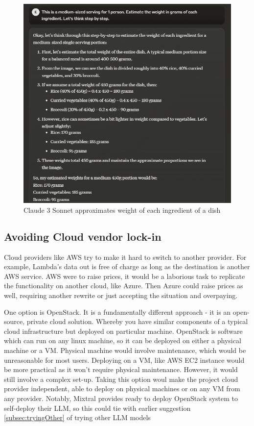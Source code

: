 \begin{figure}
    
    \centering
    \includegraphics[width=1\textwidth,keepaspectratio]{../images/sonnet_vision_2.png}
    \caption{Claude 3 Sonnet approximates weight of each ingredient of a dish}
    \label{fig:sonnetV2}
    
\end{figure}

\subsection{Avoiding Cloud vendor lock-in}
Cloud providers like AWS try to make it hard to switch to another provider. For example, Lambda's data out is free of charge as long as the destination is another AWS service. AWS were to raise prices, it would be a laborious task to replicate the functionality on another cloud, like Azure. Then Azure could raise prices as well, requiring another rewrite or just accepting the situation and overpaying. 

One option is OpenStack. It is a fundamentally different approach - it is an open-source, private cloud solution. Whereby you have similar components of a typical cloud infrastructure but deployed on particular machine. OpenStack is software which can run on any linux machine, so it can be deployed on either a physical machine or a VM. Physical machine would involve maintenance, which would be unreasonable for most users. Deploying on a VM, like AWS EC2 instance would be more practical as it won't require physical maintenance. However, it would still involve a complex set-up. Taking this option woul make the project cloud provider independent, able to deploy on physical machines or on any VM from any provider. Notably, Mixtral provides ready to deploy OpenStack system to self-deploy their LLM, so this could tie with earlier suggestion \ref{subsec:tryingOther} of trying other LLM models 

